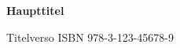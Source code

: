 \documentclass[open=any, index=totoc, paper=160mm:234mm, chapterprefix=true,
	fontsize=10pt, DIV=10, BCOR=12mm]{scrbook}
\newlength{\habItemLen}
\newcommand{\flexitem}[3][7mm]{%
	\settowidth{\habItemLen}{#2~}%
	\ifnumbering%
		\pstart%
	\else%
		\par%
	\fi%
	\vspace{0.25\baselineskip}\hangindent=#1mm\hangafter=1\noindent%
	\ifdim\habItemLen < #1mm%
		\makebox[#1mm][l]{#2}#3%
	\else%
		#2 #3%
	\fi%
	\ifnumbering\pend\fi%
}
\begin{document}
\clearpage\thispagestyle{empty}\begin{center}\vspace*{3\baselineskip}
\textbf{\LARGE Haupttitel}
\end{center}
\clearpage\thispagestyle{empty}
\noindent Titelverso
\vspace{25\baselineskip}
\vfill
\noindent ISBN 978-3-123-45678-9
%
\setcounter{page}{4}
\tableofcontents
\end{document}
